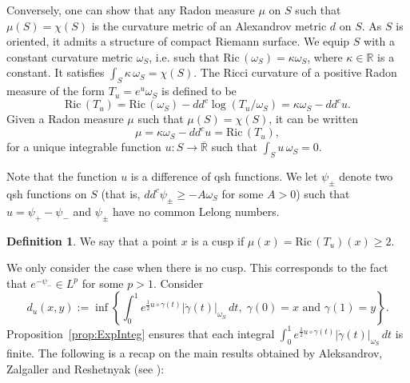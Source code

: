 \documentclass[a4paper,11pt,leqno,english]{smfart}
\theoremstyle{plain}
\theoremstyle{plain}
\numberwithin{equation}{section} %
\numberwithin{figure}{section} %
\theoremstyle{plain}
\theoremstyle{plain}
\theoremstyle{remark}
\theoremstyle{remark}
\theoremstyle{definition}
\theoremstyle{plain}
\theoremstyle{plain}
\theoremstyle{definition}
\newtheorem{defi}[thm]{Definition}
\newcommand{\R}{{\mathbb{R}}}
\newcommand{\p}{\psi}
\newcommand{\Ric}{\mathrm{Ric} \,}
\begin{document}
 Conversely, one can show that
 any Radon measure $\mu$ on $S$ such that $\mu(S)=\chi(S)$ is
 the curvature metric of an Alexandrov metric $d$ on $S$.
  As $S$ is oriented, it admits a structure of compact Riemann surface.
    We equip  $S$ with a constant curvature metric $\omega_S$,
    i.e. such that $\Ric(\omega_S )= \kappa \omega_S$, where $\kappa \in \R$ is a constant.
    It satisfies $\int_S \kappa \,\omega_S=\chi(S)$. 
    The  Ricci curvature of   a positive Radon measure of the form $T_u=e^{u} \omega_S$  is defined to be
    $$
    \Ric(T_u)=\Ric(\omega_S)-dd^c \log (T_u/\omega_S)=\kappa \omega_S-dd^c u.
    $$
    Given  a Radon measure $\mu$
   such that $\mu(S)=\chi(S)$, it can be written
    $$
    \mu=\kappa \omega_S-dd^c u=\Ric(T_u),
    $$
    for a unique integrable function $u:S \rightarrow \overline{\R}$ such that
    $\int_S u \,\omega_S=0$. 
    
    Note that the function $u$ is a difference of 
    qsh functions.
      We let $\p_{\pm}$ denote two qsh functions on $S$
  (that is, $dd^c \p_{\pm} \geq -A \omega_S$ for some $A>0$) 
  such that $u=\p_+-\p_-$ and $\p_\pm$ have no common Lelong numbers.   
   \begin{defi}\label{defn-cusp}
 We say that a point $x$ is a cusp  if $\mu(x)=\Ric(T_u)(x) \geq 2$. 
 \end{defi}
 
We only consider the case when there is no cusp.
  This corresponds to the fact that 
  $e^{-\psi_-}\in L^p$ for some $p>1$.
 Consider
  $$
  d_{u}(x,y):=\inf \left\{ 
  \int_0^1 e^{\frac{1}{2} u \circ \gamma(t)} |\dot{\gamma}(t)|_{\omega_S} \,dt, \; \gamma(0)=x \text{ and } \gamma(1)=y 
  \right\}.
  $$
Proposition~\ref{prop:ExpInteg} ensures that 
   each integral $\int_0^1 e^{\frac{1}{2} u \circ \gamma(t)} |\dot{\gamma}(t)|_{\omega_S} \,dt$ is finite.
   The following is a recap on the main results obtained by Aleksandrov, Zalgaller and Reshetnyak 
(see \cite[Proposition 5.3, Theorem 6.1, Theorem 6.2, Corollary 6.3, Theorem 6.4]{Troy09}):
\end{document}
